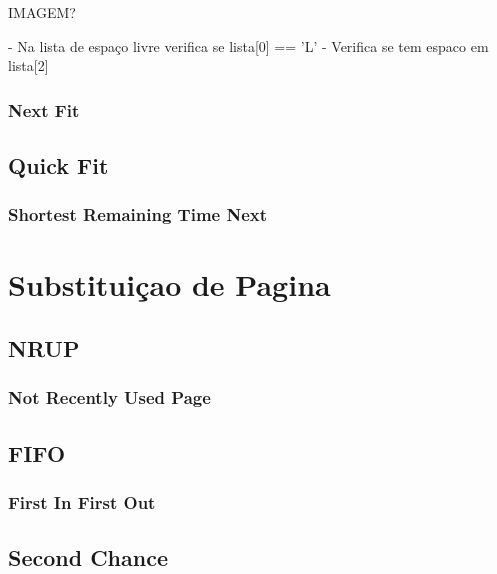 \documentclass{beamer}
\begin{document}
\begin{frame}

IMAGEM?

- Na lista de espaço livre verifica se lista[0] == 'L'
- Verifica se tem espaco em lista[2]


\justifying


\begin{frame}
\frametitle{Next Fit}


\justifying
\end{frame}

\subsection{Quick Fit}
\begin{frame}
\frametitle{Shortest Remaining Time Next}

\justifying
\end{frame}

\section{Substituiçao de Pagina}
\subsection{NRUP} 

\begin{frame}
\frametitle{Not Recently Used Page}

\justifying
\end{frame}




\subsection{FIFO} 

\begin{frame}
\frametitle{First In First Out}

\justifying

\end{frame}

\subsection{Second Chance} 


\end{frame}
\end{document}
